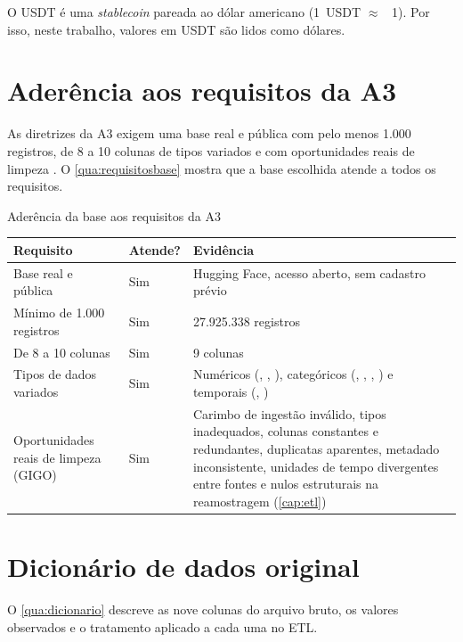 O USDT é uma \textit{stablecoin} pareada ao dólar americano (1~USDT
$\approx$ \usd~1). Por isso, neste trabalho, valores em USDT são lidos como
dólares.

\section{Aderência aos requisitos da A3}\label{sec:aderencia}

As diretrizes da A3 exigem uma base real e pública com pelo menos 1.000
registros, de 8 a 10 colunas de tipos variados e com oportunidades reais de
limpeza \cite{usjt2026}. O \autoref{qua:requisitosbase} mostra que a base
escolhida atende a todos os requisitos.

\begin{quadro}[htbp]
\caption{\label{qua:requisitosbase}Aderência da base aos requisitos da A3}
\begin{corpotabela}
\begin{tabularx}{\textwidth}{|L{4.6cm}|C{1.6cm}|Y|}
\hline
\textbf{Requisito} & \textbf{Atende?} & \textbf{Evidência} \\ \hline
Base real e pública & Sim & Hugging Face, acesso aberto, sem cadastro prévio \\ \hline
Mínimo de 1.000 registros & Sim & 27.925.338 registros \\ \hline
De 8 a 10 colunas & Sim & 9 colunas \\ \hline
Tipos de dados variados & Sim & Numéricos (, , ), categóricos (, , , ) e temporais (, ) \\ \hline
Oportunidades reais de limpeza (GIGO) & Sim & Carimbo de ingestão inválido, tipos inadequados, colunas constantes e redundantes, duplicatas aparentes, metadado inconsistente, unidades de tempo divergentes entre fontes e nulos estruturais na reamostragem (\autoref{cap:etl}) \\ \hline
\end{tabularx}
\end{corpotabela}
\fonteautores[Elaborado]
\end{quadro}

\section{Dicionário de dados original}\label{sec:dicionario}

O \autoref{qua:dicionario} descreve as nove colunas do arquivo bruto, os valores
observados e o tratamento aplicado a cada uma no ETL.

